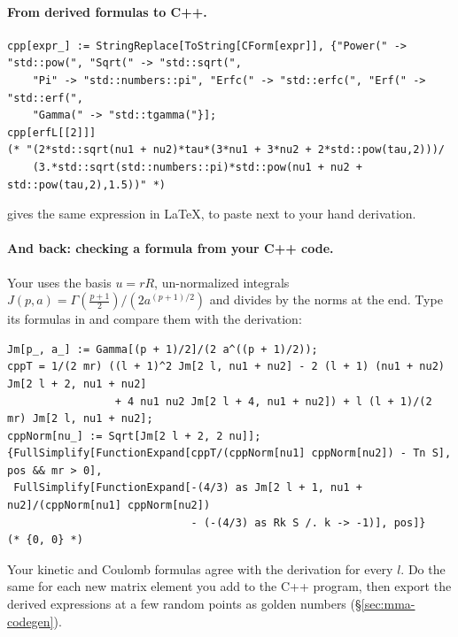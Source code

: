\documentclass[11pt,a4paper]{article}
\numberwithin{equation}{section}
\theoremstyle{definition}
\theoremstyle{plain}
\theoremstyle{remark}
\numberwithin{algorithm}{section}
\begin{document}
\paragraph{From derived formulas to C++.}
\begin{lstlisting}[style=wl]
cpp[expr_] := StringReplace[ToString[CForm[expr]], {"Power(" -> "std::pow(", "Sqrt(" -> "std::sqrt(",
    "Pi" -> "std::numbers::pi", "Erfc(" -> "std::erfc(", "Erf(" -> "std::erf(",
    "Gamma(" -> "std::tgamma("}];
cpp[erfL[[2]]]
(* "(2*std::sqrt(nu1 + nu2)*tau*(3*nu1 + 3*nu2 + 2*std::pow(tau,2)))/
    (3.*std::sqrt(std::numbers::pi)*std::pow(nu1 + nu2 + std::pow(tau,2),1.5))" *)
\end{lstlisting}
 gives the same expression in \LaTeX{}, to paste next to your hand derivation.
\paragraph{And back: checking a formula from your C++ code.} Your  uses the basis $u=rR$, un-normalized integrals $J(p,a)=\Gamma(\frac{p+1}2)/(2a^{(p+1)/2})$ and divides by the norms at the end. Type its formulas in and compare them with the derivation:
\begin{lstlisting}[style=wl]
Jm[p_, a_] := Gamma[(p + 1)/2]/(2 a^((p + 1)/2));
cppT = 1/(2 mr) ((l + 1)^2 Jm[2 l, nu1 + nu2] - 2 (l + 1) (nu1 + nu2) Jm[2 l + 2, nu1 + nu2]
                 + 4 nu1 nu2 Jm[2 l + 4, nu1 + nu2]) + l (l + 1)/(2 mr) Jm[2 l, nu1 + nu2];
cppNorm[nu_] := Sqrt[Jm[2 l + 2, 2 nu]];
{FullSimplify[FunctionExpand[cppT/(cppNorm[nu1] cppNorm[nu2]) - Tn S], pos && mr > 0],
 FullSimplify[FunctionExpand[-(4/3) as Jm[2 l + 1, nu1 + nu2]/(cppNorm[nu1] cppNorm[nu2])
                             - (-(4/3) as Rk S /. k -> -1)], pos]}                  (* {0, 0} *)
\end{lstlisting}
Your kinetic and Coulomb formulas agree with the derivation for every $l$. Do the same for each new matrix element you add to the C++ program, then export the derived expressions at a few random points as golden numbers (\S\ref{sec:mma-codegen}).
\end{document}
